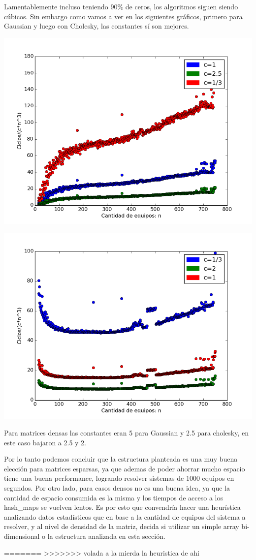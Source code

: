Lamentablemente incluso teniendo 90$\%$ de ceros, los algoritmos siguen siendo cúbicos. Sin embargo como vamos a ver en los siguientes gráficos, primero para Gaussian y luego con Cholesky, las constantes sí son mejores.

\includegraphics[scale=0.7]{img/constantefixedgaussian.png}
  
\includegraphics[scale=0.7]{img/constantefixedcholesky.png}

Para matrices densas las constantes eran 5 para Gaussian y 2.5 para cholesky, en este caso bajaron a 2.5 y 2.

Por lo tanto podemos concluir que la estructura planteada es una muy buena elección para matrices esparsas, ya que ademas de poder ahorrar mucho espacio tiene una buena performance, logrando resolver sistemas de 1000 equipos en segundos. Por otro lado, para casos densos no es una buena idea, ya que la cantidad de espacio consumida es la misma y los tiempos de acceso a los hash_maps se vuelven lentos. Es por esto que convendría hacer una heurística analizando datos estadísticos que en base a la cantidad de equipos del sistema a resolver, y al nivel de densidad de la matriz, decida si utilizar un simple array bi-dimensional o la estructura analizada en esta sección.

=======
>>>>>>> volada a la mierda la heuristica de ahi
